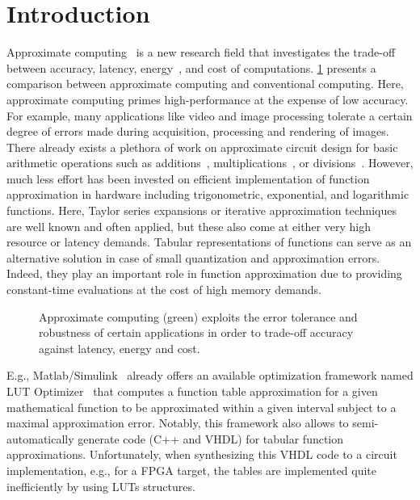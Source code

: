 \section{Introduction}
\label{sec:intro}
Approximate computing~\cite{xu2015approximate} is a new research field that investigates the trade-off between accuracy, latency, energy~\cite{xu2015approximate,OrshanskySurvey}, and cost of computations. 
\cref{fig:ac} presents a comparison between approximate computing and conventional computing.
Here, approximate computing primes high-performance at the expense of low accuracy.
For example, many applications like video and image processing tolerate a certain degree of errors made during acquisition, processing and rendering of images. 
There already exists a plethora of work on approximate circuit design for basic arithmetic operations such as additions~\cite{adderBecher,Seo:2020, Echavarria:2016}, multiplications~\cite{Mult:2015,Mult:2019}, or divisions~\cite{anytimeBrand}. 
However, much less effort has been invested on efficient implementation of function approximation in hardware including trigonometric, exponential, and logarithmic functions.
Here, Taylor series expansions or iterative approximation techniques are well known and often applied, but these also come at either very high resource or latency demands. 
Tabular representations of functions can serve as an alternative solution in case of small quantization and approximation errors. 
Indeed, they play an important role in function approximation due to providing constant-time evaluations at the cost of high memory demands.
\begin{figure}[t!]
    \centering
    \resizebox{!}{0.5\columnwidth}{
    \begin{tikzpicture}
        \tradeoffAC
    \end{tikzpicture}
}
\caption{\label{fig:ac}Approximate computing (green) exploits the error tolerance and robustness of certain applications in order to trade-off accuracy against latency, energy and cost.}
\end{figure}
E.g., Matlab/Simulink~\cite{MATLAB:2019} already offers an available optimization framework named \ac{LUT} Optimizer~\cite{MATLAB:reference} that computes a function table approximation for a given mathematical function to be approximated within a given interval subject to a maximal approximation error.
Notably, this framework also allows to semi-automatically generate code (C++ and VHDL) for tabular function approximations.
Unfortunately, when synthesizing this VHDL code to a circuit implementation, e.g., for a \ac{FPGA} target, the tables are implemented quite inefficiently by using \acp{LUT} structures.
